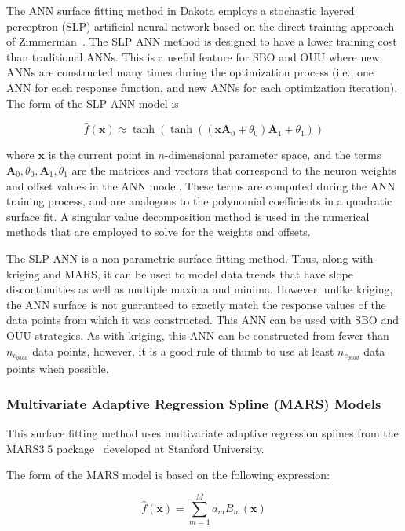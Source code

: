The ANN surface fitting method in Dakota employs a stochastic layered
perceptron (SLP) artificial neural network based on the direct
training approach of Zimmerman~\cite{Zim96}. The SLP ANN method is
designed to have a lower training cost than traditional ANNs. This is
a useful feature for SBO and OUU where new ANNs are constructed many
times during the optimization process (i.e., one ANN for each response
function, and new ANNs for each optimization iteration). The form of
the SLP ANN model is

\begin{equation}
  \hat{f}(\mathbf{x}) \approx
  \tanh(\tanh((\mathbf{x A}_{0}+\theta_{0})\mathbf{A}_{1}+\theta_{1}))
  \label{models:surf:equation09}
\end{equation}

where $\mathbf{x}$ is the current point in $n$-dimensional parameter
space, and the terms
$\mathbf{A}_{0},\theta_{0},\mathbf{A}_{1},\theta_{1}$ are the matrices
and vectors that correspond to the neuron weights and offset values in
the ANN model. These terms are computed during the ANN training
process, and are analogous to the polynomial coefficients in a
quadratic surface fit. A singular value decomposition method is used
in the numerical methods that are employed to solve for the weights
and offsets.

The SLP ANN is a non parametric surface fitting method. Thus, along
with kriging and MARS, it can be used to model data trends that have
slope discontinuities as well as multiple maxima and minima. However,
unlike kriging, the ANN surface is not guaranteed to exactly match the
response values of the data points from which it was constructed. This
ANN can be used with SBO and OUU strategies. As with kriging, this ANN
can be constructed from fewer than $n_{c_{quad}}$ data points,
however, it is a good rule of thumb to use at least $n_{c_{quad}}$
data points when possible.

\subsubsection{Multivariate Adaptive Regression Spline (MARS) Models}\label{models:surf:mars}

This surface fitting method uses multivariate adaptive regression
splines from the MARS3.5 package~\cite{Fri91} developed at Stanford
University. 

The form of the MARS model is based on the following expression:

\begin{equation}
  \hat{f}(\mathbf{x})=\sum_{m=1}^{M}a_{m}B_{m}(\mathbf{x})
  \label{models:surf:equation10}  
\end{equation}

